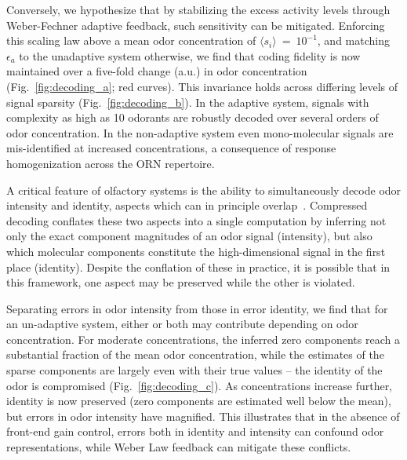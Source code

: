 Conversely, we hypothesize that by stabilizing the excess activity levels through Weber-Fechner adaptive feedback, such sensitivity can be mitigated. Enforcing this scaling law above a mean odor concentration of $\langle s_i \rangle~=~10^{-1}$, and matching $\epsilon_a$ to the unadaptive system otherwise, we find that coding fidelity is now maintained over a five-fold change (a.u.) in odor concentration (Fig.~\ref{fig:decoding_a}; red curves). %
This invariance holds across differing levels of signal sparsity (Fig.~\ref{fig:decoding_b}). In the adaptive system, signals with complexity as high as 10 odorants are robustly decoded over several orders of odor concentration. In the non-adaptive system even mono-molecular signals are mis-identified at increased concentrations, a consequence of response homogenization across the ORN repertoire.


A critical feature of olfactory systems is the ability to simultaneously decode odor intensity and identity, aspects which can in principle overlap~\cite{intensity_vs_identity, segregation_intensity_identity}. Compressed decoding conflates these two aspects into a single computation by inferring not only the exact component magnitudes of an odor signal (intensity), but also which molecular components constitute the high-dimensional signal in the first place (identity). Despite the conflation of these in practice, it is possible that in this framework, one aspect may be preserved while the other is violated. 

Separating errors in odor intensity from those in error identity, we find that for an un-adaptive system, either or both may contribute depending on odor concentration. For moderate concentrations, the inferred zero components reach a substantial fraction of the mean odor concentration, while the estimates of the sparse components are largely even with their true values -- the identity of the odor is compromised (Fig.~\ref{fig:decoding_c}). As concentrations increase further, identity is now preserved (zero components are estimated well below the mean), but errors in odor intensity have magnified. This illustrates that in the absence of front-end gain control, errors both in identity and intensity can confound odor representations, while Weber Law feedback can mitigate these conflicts. 



